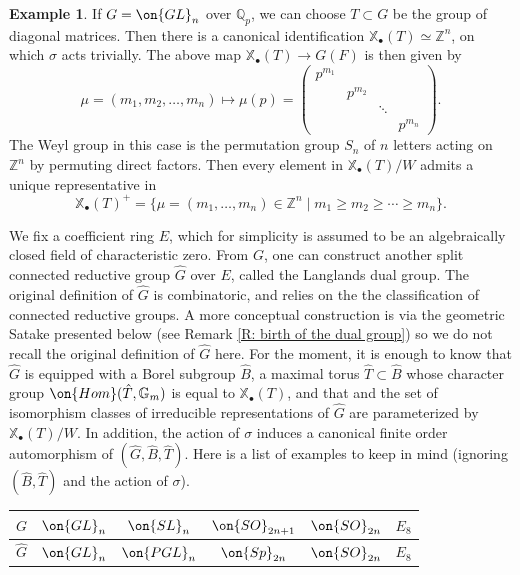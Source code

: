 \documentclass[11pt]{amsart}
\theoremstyle{definition}
\theoremstyle{definition}
\newtheorem{ex}[thm]{Example}
\theoremstyle{definition}
\numberwithin{equation}{subsection}
\newcommand{\bG}{{\mathbb G}}
\newcommand{\bQ}{{\mathbb Q}}
\newcommand{\bZ}{{\mathbb Z}}
\newcommand{\Hom}{{\on{Hom}}}
\newcommand{\GL}{{\on{GL}}}
\def\xcoch{\mathbb{X}_\bullet}
\begin{document}
\begin{ex}\label{coweightGLn}
If $G=\GL_n$ over $\bQ_p$, we can choose $T\subset G$ be the group of diagonal matrices. Then there is a canonical identification $\xcoch(T)\simeq \bZ^n$, on which $\sigma$ acts trivially. The above map $\xcoch(T)\to G(F)$ is then given by 
\[\mu=(m_1,m_2,\ldots,m_n)\mapsto \mu(p)=\begin{pmatrix}p^{m_1}&&&\\&p^{m_2}&&\\ &&\ddots&\\ &&& p^{m_n}\end{pmatrix}.\]
The Weyl group in this case is the permutation group $S_n$ of $n$ letters acting on $\bZ^n$ by permuting direct factors. Then every element in $\xcoch(T)/W$ admits a unique representative in
$$\xcoch(T)^+=\{\mu=(m_1,\ldots,m_n)\in \bZ^n\mid m_1\geq m_2\geq\cdots\geq m_n\}.$$
\end{ex}


We fix a coefficient ring $E$, which for simplicity is assumed to be an algebraically closed field of characteristic zero.
From $G$, one can construct another split connected reductive group $\hat G$ over $E$, called the Langlands dual group. The original definition of $\hat G$ is combinatoric, and relies on the the classification of connected reductive groups. A more conceptual construction is via the geometric Satake presented below (see Remark \ref{R: birth of the dual group}) so we do not recall the original definition of $\hat G$ here. For the moment, it is enough to know that $\hat G$ is equipped with a Borel subgroup $\hat B$, a maximal torus $\hat T\subset \hat B$ whose character group $\Hom(\hat T,\bG_m)$ is equal to $\xcoch(T)$, and that and the set of isomorphism classes of irreducible representations of $\hat G$ are parameterized by $\xcoch(T)/W$. In addition, the action of $\sigma$ induces a canonical finite order automorphism of $(\hat G,\hat B, \hat T)$.
Here is a list of examples to keep in mind (ignoring $(\hat B,\hat T)$ and the action of $\sigma$).

\medskip

\begin{center}
\begin{tabular}{| c | c | c | c | c | c |}
\hline 
$G$ & $\GL_n$ & $\on{SL}_n$ & $\on{SO}_{2n+1}$ & $\on{SO}_{2n}$ & $E_8$  \\ \hline 
$\hat G$ & $\GL_n$ & $\on{PGL}_{n}$ & $\on{Sp}_{2n}$ & $\on{SO}_{2n}$ & $E_8$ \\ \hline 
\end{tabular}
\end{center}
\end{document}
